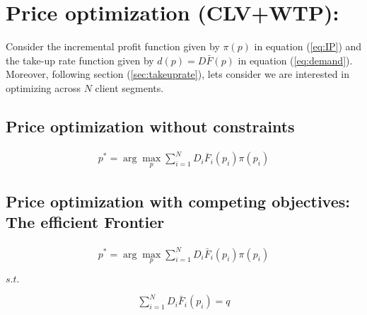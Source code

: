 \chapter{Price optimization (CLV+WTP): }

Consider the incremental profit function given by $\pi(p)$ in equation (\ref{eq:IP}) and the take-up rate function given by $d(p)=D\bar{F}(p)$ in equation (\ref{eq:demand}). Moreover, following section (\ref{sec:takeuprate}), lets consider we are interested in optimizing across $N$ client segments.
\section{Price optimization without constraints}
\begin{align}
p^*= \arg \max_p \sum_{i=1}^N D_i\overline{F}_i(p_i)\pi(p_i)
\end{align}

\section{Price optimization with competing objectives: The efficient Frontier}

\begin{align}
p^*= \arg \max_p \sum_{i=1}^N D_i\bar{F}_i(p_i)\pi(p_i)
\end{align}
\begin{center}
    $s.t.$
\end{center}
\begin{align}
\sum_{i=1}^N D_i\bar{F}_i(p_i) =q
\end{align}